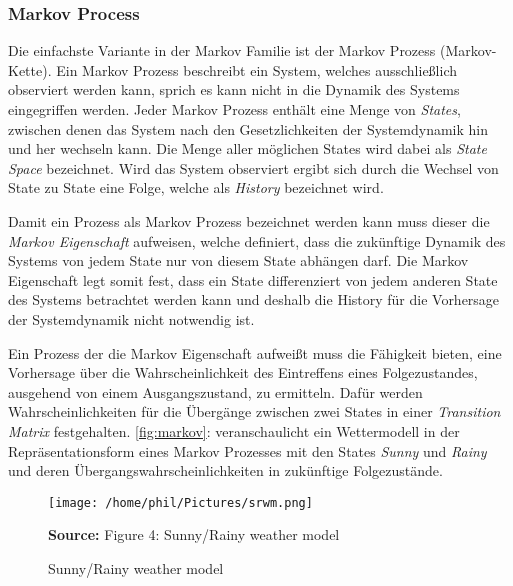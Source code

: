 \documentclass[11pt]{scrartcl}
\newcommand{\source}[1]{\vspace{-5pt} \caption*{\hfill \textbf{Source:} {#1}} }
\begin{document}
\subsubsection{Markov Process}
Die einfachste Variante in der Markov Familie ist der Markov Prozess (Markov-Kette). Ein Markov Prozess
beschreibt ein System, welches ausschließlich observiert werden kann, sprich es kann nicht in die Dynamik
des Systems eingegriffen werden. Jeder Markov Prozess enthält eine Menge von \textit{States}, zwischen
denen das System nach den Gesetzlichkeiten der Systemdynamik hin und her wechseln kann. Die Menge aller
möglichen States wird dabei als \textit{State Space} bezeichnet. Wird das System observiert ergibt sich
durch die Wechsel von State zu State eine Folge, welche als \textit{History} bezeichnet wird. 

Damit ein Prozess als Markov Prozess bezeichnet werden kann muss dieser die \textit{Markov Eigenschaft}
aufweisen, welche definiert, dass die zukünftige Dynamik des Systems von jedem State nur von diesem State abhängen darf. Die Markov Eigenschaft legt somit fest, dass ein State differenziert von jedem anderen State 
des Systems betrachtet werden kann und deshalb die History für die Vorhersage der Systemdynamik nicht
notwendig ist.

Ein Prozess der die Markov Eigenschaft aufweißt muss die Fähigkeit bieten, eine Vorhersage über
die Wahrscheinlichkeit des Eintreffens eines Folgezustandes, ausgehend von einem Ausgangszustand, zu 
ermitteln. Dafür werden Wahrscheinlichkeiten für die Übergänge zwischen zwei States in einer 
\textit{Transition Matrix} festgehalten. \autoref{fig:markov}:  veranschaulicht
ein Wettermodell in der Repräsentationsform eines Markov Prozesses mit den States \textit{Sunny} und
\textit{Rainy} und deren Übergangswahrscheinlichkeiten in zukünftige Folgezustände.

\begin{figure}[htp]
\centering
\texttt{[image: /home/phil/Pictures/srwm.png]}
\caption{Sunny/Rainy weather model}
\source{Figure 4: Sunny/Rainy weather model \cite[~S.13]{L2018}}
\label{fig:markov}
\end{figure}
\end{document}
